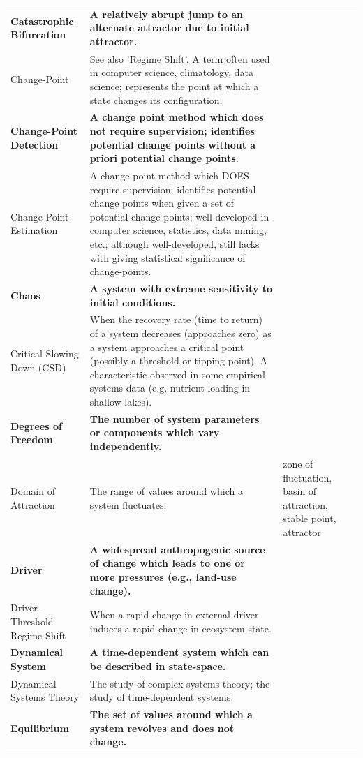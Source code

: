 \documentclass[print]{nuthesis}
\begin{document}
\begin{landscape}
\begin{longtable}{>{\raggedright\arraybackslash}p{12em}>{\raggedright\arraybackslash}p{35em}>{\raggedright\arraybackslash}p{8em}}
\addlinespace
\textbf{Catastrophic Bifurcation} & \textbf{A relatively abrupt jump to an alternate attractor due to initial attractor.} & \textbf{}\\
Change-Point & See also 'Regime Shift'. A term often used in computer science, climatology, data science; represents the point at which a state changes its configuration. & \\
\textbf{Change-Point Detection} & \textbf{A change point method which does not require supervision; identifies potential change points without a priori potential change points.} & \textbf{}\\
Change-Point Estimation & A change point method which DOES require supervision; identifies potential change points when given a set of potential change points; well-developed in computer science, statistics, data mining, etc.; although well-developed, still lacks with giving statistical significance of change-points. & \\
\textbf{Chaos} & \textbf{A system with extreme sensitivity to initial conditions.} & \textbf{}\\
\addlinespace
Critical Slowing Down (CSD) & When the recovery rate (time to return) of a system decreases (approaches zero) as a system approaches a critical point (possibly a threshold or tipping point). A characteristic observed in some empirical systems data (e.g. nutrient loading in shallow lakes). & \\
\textbf{Degrees of Freedom} & \textbf{The number of system parameters or components which vary independently.} & \textbf{}\\
Domain of Attraction & The range of values around which a system fluctuates. & zone of fluctuation, basin of attraction, stable point, attractor\\
\textbf{Driver} & \textbf{A widespread anthropogenic source of change which leads to one or more pressures (e.g., land-use change).} & \textbf{}\\
Driver-Threshold Regime Shift & When a rapid change in external driver induces a rapid change in ecosystem state. & \\
\addlinespace
\textbf{Dynamical System} & \textbf{A time-dependent system which can be described in state-space.} & \textbf{}\\
Dynamical Systems Theory & The study of complex systems theory; the study of time-dependent systems. & \\
\textbf{Equilibrium} & \textbf{The set of values around which a system revolves and does not change.} & \textbf{}\\

\end{longtable}
\end{landscape}
\end{document}
